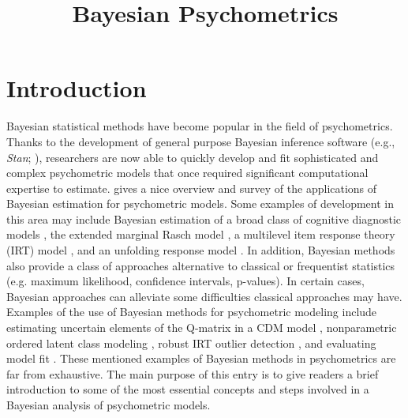 \documentclass[floatsintext, man]{apa7}
\title{Bayesian Psychometrics}
\begin{document}
\maketitle
\section{Introduction}
Bayesian statistical methods have become popular in the field of psychometrics.
Thanks to the development of general purpose Bayesian inference software (e.g.,
\emph{Stan}; \cite{gelman_stan:_2015}), researchers are now able to quickly develop and
fit sophisticated and complex psychometric models that once required significant
computational expertise to estimate. \textcite{levy_rise_2009} gives a nice overview
and survey of the applications of Bayesian estimation for psychometric models.
Some examples of development in this area may include Bayesian estimation of a
broad class of cognitive diagnostic models 
\parencite{liu_estimating_2019,culpepper_bayesian_2015}, the
extended marginal Rasch model \parencite{maris_gibbs_2015}, a multilevel item
response theory (IRT) model \parencite{fox_bayesian_2001}, and an unfolding
response model \parencite{johnson_using_2003}. In addition, Bayesian
methods also provide a class of approaches alternative to classical or
frequentist statistics (e.g. maximum likelihood, confidence intervals,
p-values). In certain cases, Bayesian approaches can alleviate some difficulties
classical approaches may have. Examples of the use of Bayesian methods for psychometric modeling include estimating uncertain elements of the Q-matrix in a CDM
model \parencite{decarlo_recognizing_2012}, nonparametric ordered latent class
modeling \parencite{liu_three_2019}, robust IRT outlier detection 
\parencite{ozturk_bayesian_2017}, and evaluating model fit 
\parencite{sinharay_assessing_2007,sinharay_assessing_2005,sinharay_assessment_2015}. These mentioned examples of Bayesian methods in psychometrics are far from exhaustive.
The main purpose of this entry is to give readers a brief introduction to some
of the most essential concepts and steps involved in a Bayesian analysis of
psychometric models.
\end{document}
